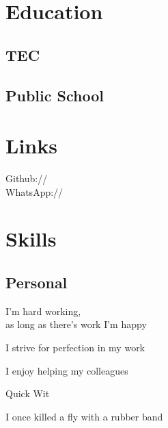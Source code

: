 \documentclass[]{cv}
\begin{document}

\begin{minipage}[t]{0.33\textwidth} 

\section{Education} 

\subsection{TEC}
\sectionsep

\subsection{Public School}
\sectionsep

\section{Links} 
Github:// \href{https://github.com/rwejlgaard}{} \\
WhatsApp://  
\sectionsep

\section{Skills}
\subsection{Personal}

\vspace{\topsep}
\begin{tightemize}
	\item I'm hard working,\\ as long as there's work I'm happy
	\item I strive for perfection in my work
	\item I enjoy helping my colleagues
\end{tightemize}
\begin{tightemize}
	\item Quick Wit
	\item I once killed a fly with a rubber band
\end{tightemize}
\sectionsep


\end{minipage}
\end{document}
